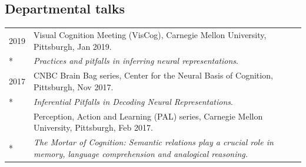 \documentclass[letterpaper]{article}
\begin{document}
\subsection*{Departmental talks}
\begin{longtable}{p{0.7cm}p{15cm}}
  2019 & Visual Cognition Meeting (VisCog), Carnegie Mellon University, Pittsburgh, Jan 2019.            \\* & {\it Practices and pitfalls in inferring neural representations}.\\[6pt]
  2017 & CNBC Brain Bag series, Center for the Neural Basis of Cognition, Pittsburgh, Nov 2017.          \\* & {\it Inferential Pitfalls in Decoding Neural Representations}.\\[6pt]
       & Perception, Action and Learning (PAL) series, Carnegie Mellon University, Pittsburgh, Feb 2017. \\* & {\it The Mortar of Cognition: Semantic relations play a crucial role in memory, language comprehension and analogical reasoning.}\\
\end{longtable}
\end{document}
